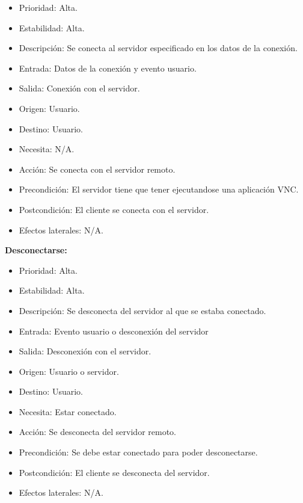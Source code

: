 \begin{itemize}
\item Prioridad: Alta.
\item Estabilidad: Alta.
\item Descripción: Se conecta al servidor especificado en los datos de la conexión.
\item Entrada: Datos de la conexión y evento usuario.
\item Salida: Conexión con el servidor.
\item Origen: Usuario.
\item Destino: Usuario.
\item Necesita: N/A.
\item Acción: Se conecta con el servidor remoto.
\item Precondición: El servidor tiene que tener ejecutandose una aplicación VNC.
\item Postcondición: El cliente se conecta con el servidor.
\item Efectos laterales: N/A.\\

\end{itemize}
\newpage
\textbf{Desconectarse:}
\begin{itemize}
\item Prioridad: Alta.
\item Estabilidad: Alta.
\item Descripción: Se desconecta del servidor al que se estaba conectado.
\item Entrada: Evento usuario o desconexión del servidor
\item Salida: Desconexión con el servidor.
\item Origen: Usuario o servidor.
\item Destino: Usuario.
\item Necesita: Estar conectado.
\item Acción: Se desconecta del servidor remoto.
\item Precondición: Se debe estar conectado para poder desconectarse.
\item Postcondición: El cliente se desconecta del servidor.
\item Efectos laterales: N/A.\\

\end{itemize}

